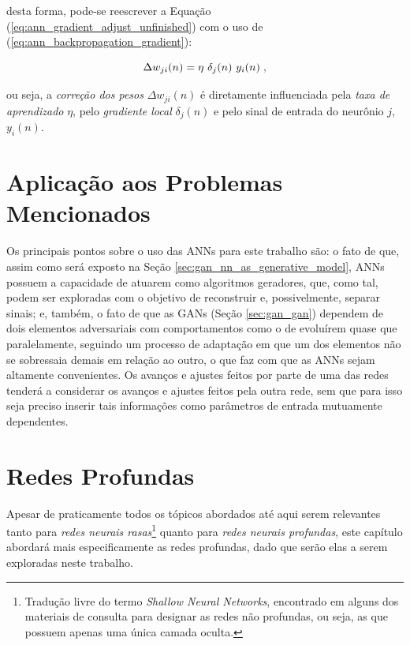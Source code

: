 \noindent desta forma, pode-se reescrever a Equação (\ref{eq:ann_gradient_adjust_unfinished}) com o uso de (\ref{eq:ann_backpropagation_gradient}):

\begin{equation}
    \Delta w_{ji}(n) = \eta\ \delta_{j}(n)\ y_{i}(n)
    \label{eq:ann_gradient_adjust}
    \hspace{0.1cm},
    \vspace{0.2cm}
\end{equation}

\noindent ou seja, a \textit{correção dos pesos} $\Delta w_{ji}(n)$ é diretamente influenciada pela \textit{taxa de aprendizado} $\eta$, pelo \textit{gradiente local} $\delta_{j}(n)$ e pelo sinal de entrada do neurônio $j$, $y_{i}(n)$. 


\section{Aplicação aos Problemas Mencionados}
\label{sec:ann_application_mentioned_problem}

Os principais pontos sobre o uso das ANNs para este trabalho são: o fato de que, assim como será exposto na Seção \ref{sec:gan_nn_as_generative_model}, ANNs possuem a capacidade de atuarem como algoritmos geradores, que, como tal, podem ser exploradas com o objetivo de reconstruir e, possivelmente, separar sinais; e, também, o fato de que as GANs (Seção \ref{sec:gan_gan}) dependem de dois elementos adversariais com comportamentos como o de evoluírem quase que paralelamente, seguindo um processo de adaptação em que um dos elementos não se sobressaia demais em relação ao outro, o que faz com que as ANNs sejam altamente convenientes. Os avanços e ajustes feitos por parte de uma das redes tenderá a considerar os avanços e ajustes feitos pela outra rede, sem que para isso seja preciso inserir tais informações como parâmetros de entrada mutuamente dependentes.


\section{Redes Profundas}
\label{sec:ann_deep_networks}

Apesar de praticamente todos os tópicos abordados até aqui serem relevantes tanto para \textit{redes neurais rasas}\footnote{Tradução livre do termo \textit{Shallow Neural Networks}, encontrado em alguns dos materiais de consulta para designar as redes não profundas, ou seja, as que possuem apenas uma única camada oculta.} quanto para \textit{redes neurais profundas}, este capítulo abordará mais especificamente as redes profundas, dado que serão elas a serem exploradas neste trabalho.

